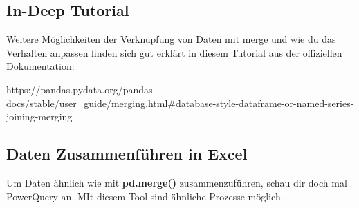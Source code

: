 \documentclass[11pt]{article}
\begin{document}
    \subsection{In-Deep Tutorial}\label{in-deep-tutorial}

Weitere Möglichkeiten der Verknüpfung von Daten mit merge und wie du das
Verhalten anpassen finden sich gut erklärt in diesem Tutorial aus der
offiziellen Dokumentation:

https://pandas.pydata.org/pandas-docs/stable/user\_guide/merging.html\#database-style-dataframe-or-named-series-joining-merging

\subsection{Daten Zusammenführen in
Excel}\label{daten-zusammenfuxfchren-in-excel}

Um Daten ähnlich wie mit \textbf{pd.merge()} zusammenzuführen, schau dir
doch mal PowerQuery an. MIt diesem Tool sind ähnliche Prozesse möglich.


    
    
    
    
\end{document}
